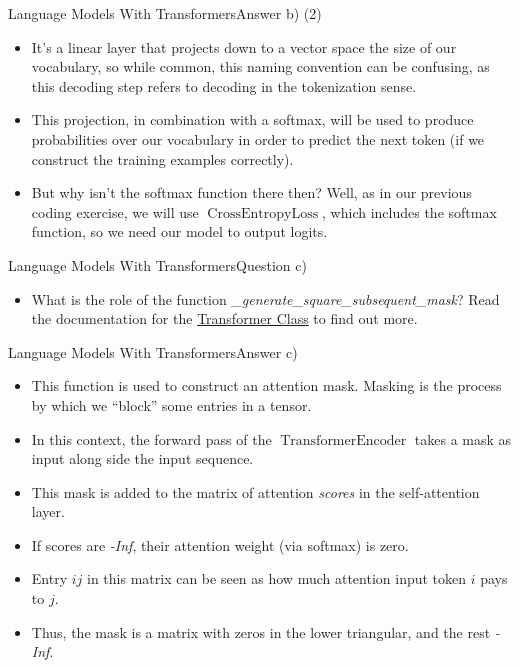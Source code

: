 \documentclass[t]{beamer}
\newcommand\op[1]{\operatorname{#1}}
\begin{document}
\begin{frame}{Language Models With Transformers}{Answer b) (2)}
    \begin{itemize}
        \item It's a linear layer that projects down to a vector space the size
              of our vocabulary, so while common, this naming convention can be
              confusing, as this decoding step refers to decoding in the
              tokenization sense.
        \item This projection, in combination with a softmax, will be used to
              produce probabilities over our vocabulary in order to predict the
              next token (if we construct the training examples correctly).
        \item But why isn't the softmax function there then?
              Well, as in our previous coding exercise, we will use
              $\op{CrossEntropyLoss}$, which includes the softmax function, so
              we need our model to output logits.
    \end{itemize}
\end{frame}

\begin{frame}{Language Models With Transformers}{Question c)}
    \begin{itemize}
        \item What is the role of the function
              \emph{\_generate\_square\_subsequent\_mask}? Read the documentation
              for the
              \href{https://pytorch.org/docs/stable/generated/torch.nn.TransformerEncoder.html}{Transformer Class}
              to find out more.
    \end{itemize}
\end{frame}

\begin{frame}{Language Models With Transformers}{Answer c)}
    \begin{itemize}
        \item This function is used to construct an attention mask.
              Masking is the process by which we ``block'' some entries in a
              tensor.
        \item In this context, the forward pass of the $\op{TransformerEncoder}$
              takes a mask as input along side the input sequence.
        \item This mask is added to the matrix of attention \emph{scores} in the
              self-attention layer.
        \item If scores are \emph{-Inf}, their attention weight (via softmax) is
              zero.
        \item Entry $ij$ in this matrix can be seen as how much attention input
              token $i$ pays to $j$.
        \item Thus, the mask is a matrix with zeros in the lower triangular, and
              the rest \emph{-Inf}.
    \end{itemize}
\end{frame}
\end{document}
